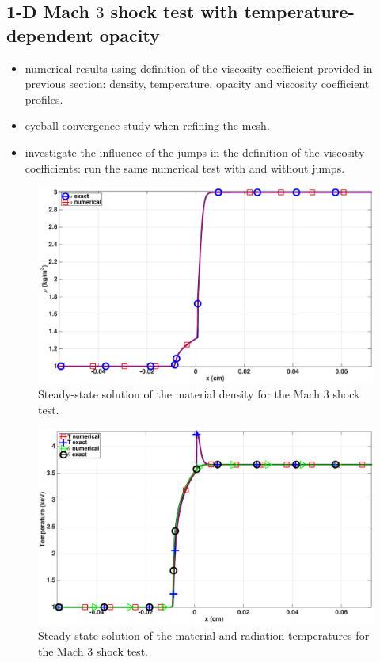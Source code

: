 \documentclass[times,doublespace]{fldauth}%
\begin{document}
\subsection{1-D Mach $3$ shock test with temperature-dependent opacity}
%
\begin{itemize}
\item numerical results using definition of the viscosity coefficient provided in previous section: density, temperature, opacity and viscosity coefficient profiles.
\item eyeball convergence study when refining the mesh.
\item investigate the influence of the jumps in the definition of the viscosity coefficients: run the same numerical test with and without jumps.
\end{itemize}
%
\begin{figure}[H]
    \centering
    \includegraphics[width=\textwidth]{figures/dpt-xs/mach_3_nel_1000_density.eps}
    \caption{Steady-state solution of the material density for the Mach 3 shock test.}\label{fig:mach-3-dpt-xs-dens}
\end{figure}
%
\begin{figure}[H]
    \centering
    \includegraphics[width=\textwidth]{figures/dpt-xs/mach_3_nel_1000_temperature.eps}
    \caption{Steady-state solution of the material and radiation temperatures for the Mach 3 shock test.}\label{fig:mach-3-dpt-xs-temp}
\end{figure}
\end{document}

